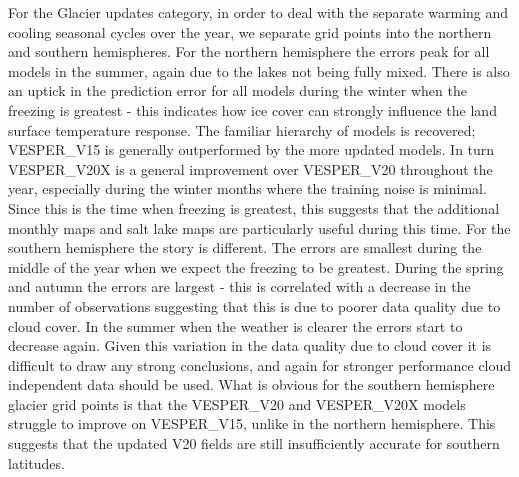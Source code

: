 \documentclass[hess, twostagejnl]{copernicus}
\begin{document}
For the Glacier updates category, in order to deal with the separate warming and cooling seasonal cycles over the year, we separate grid points into the northern and southern hemispheres. For the northern hemisphere the errors peak for all models in the summer, again due to the lakes not being fully mixed. There is also an uptick in the prediction error for all models during the winter when the freezing is greatest - this indicates how ice cover can strongly influence the land surface temperature response. The familiar hierarchy of models is recovered; VESPER\_V15 is generally outperformed by the more updated models. In turn VESPER\_V20X is a general improvement over VESPER\_V20 throughout the year, especially during the winter months where the training noise is minimal. Since this is the time when freezing is greatest, this suggests that the additional monthly maps and salt lake maps are particularly useful during this time. For the southern hemisphere the story is different. The errors are smallest during the middle of the year when we expect the freezing to be greatest. During the spring and autumn the errors are largest - this is correlated with a decrease in the number of observations suggesting that this is due to poorer data quality due to cloud cover. In the summer when the weather is clearer the errors start to decrease again. Given this variation in the data quality due to cloud cover it is difficult to draw any strong conclusions, and again for stronger performance cloud independent data should be used. What is obvious for the southern hemisphere glacier grid points is that the VESPER\_V20 and VESPER\_V20X models struggle to improve on VESPER\_V15, unlike in the northern hemisphere. This suggests that the updated V20 fields are still insufficiently accurate for southern latitudes. \newline 
\end{document}
